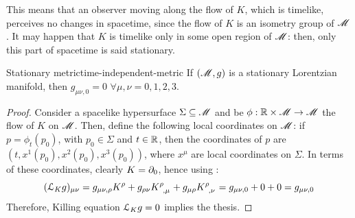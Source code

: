 This means that an observer moving along the flow of $ K $, which is timelike, perceives no changes in spacetime, since the flow of $ K $ is an isometry group of $ \mathscr{M} $. It may happen that $ K $ is timelike only in some open region of $ \mathscr{M} $: then, only this part of spacetime is said stationary.

\begin{proposition}{Stationary metric}{time-independent-metric}
  If $ (\mathscr{M} , g) $ is a stationary Lorentzian manifold, then $ g_{\mu \nu , 0} = 0 \,\, \forall \mu , \nu = 0,1,2,3 $.
\end{proposition}

\begin{proofbox}
  \begin{proof}
    Consider a spacelike hypersurface $ \Sigma \subseteq \mathscr{M} $ and be $ \phi : \mathbb{R} \times \mathscr{M} \rightarrow \mathscr{M} $ the flow of $ K $ on $ \mathscr{M} $. Then, define the following local coordinates on $ \mathscr{M} $: if $ p = \phi_t(p_0) $, with $ p_0 \in \Sigma $ and $ t \in \mathbb{R} $, then the coordinates of $ p $ are $ (t , x^1(p_0) , x^2(p_0) , x^3(p_0)) $, where $ x^\mu $ are local coordinates on $ \Sigma $. In terms of these coordinates, clearly $ K = \partial_0 $, hence using :
    \begin{equation*}
      (\ld_K g)_{\mu \nu} = g_{\mu \nu , \rho} K^\rho + g_{\rho \nu} \tensor{K}{^\rho_{,\mu}} + g_{\mu \rho} \tensor{K}{^\rho_{,\nu}} = g_{\mu \nu , 0} + 0 + 0 = g_{\mu \nu , 0}
    \end{equation*}
    Therefore, Killing equation $ \EuScript{L}_K g = 0 $ implies the thesis.
  \end{proof}
\end{proofbox}

